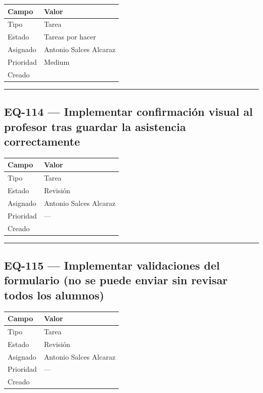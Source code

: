 \documentclass[
  spanish,
  11pt,
]{report}
\newcounter{none} %
\begin{document}
{\def\LTcaptype{none} %
\begin{longtable}[]{@{}ll@{}}
\toprule\noalign{}
Campo & Valor \\
\midrule\noalign{}
\endhead
\bottomrule\noalign{}
\endlastfoot
Tipo & Tarea \\
Estado & Tareas por hacer \\
Asignado & Antonio Salces Alcaraz \\
Prioridad & Medium \\
Creado & \\
\end{longtable}
}

\begin{center}\rule{0.5\linewidth}{0.5pt}\end{center}

\subsection{EQ-114 --- Implementar confirmación visual al profesor tras
guardar la asistencia
correctamente}\label{eq-114-implementar-confirmaciuxf3n-visual-al-profesor-tras-guardar-la-asistencia-correctamente}

{\def\LTcaptype{none} %
\begin{longtable}[]{@{}ll@{}}
\toprule\noalign{}
Campo & Valor \\
\midrule\noalign{}
\endhead
\bottomrule\noalign{}
\endlastfoot
Tipo & Tarea \\
Estado & Revisión \\
Asignado & Antonio Salces Alcaraz \\
Prioridad & --- \\
Creado & \\
\end{longtable}
}

\begin{center}\rule{0.5\linewidth}{0.5pt}\end{center}

\subsection{EQ-115 --- Implementar validaciones del formulario (no se
puede enviar sin revisar todos los
alumnos)}\label{eq-115-implementar-validaciones-del-formulario-no-se-puede-enviar-sin-revisar-todos-los-alumnos}

{\def\LTcaptype{none} %
\begin{longtable}[]{@{}ll@{}}
\toprule\noalign{}
Campo & Valor \\
\midrule\noalign{}
\endhead
\bottomrule\noalign{}
\endlastfoot
Tipo & Tarea \\
Estado & Revisión \\
Asignado & Antonio Salces Alcaraz \\
Prioridad & --- \\
Creado & \\
\end{longtable}
}
\end{document}
